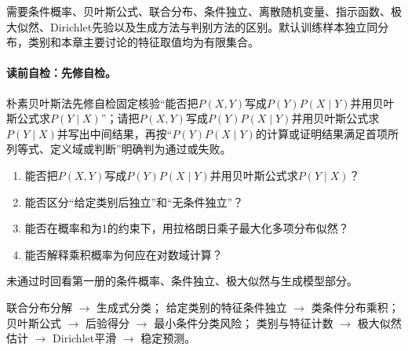 
\label{struct:V2-C03-CH02}
\begin{prerequisitebox}
需要条件概率、贝叶斯公式、联合分布、条件独立、离散随机变量、指示函数、极大似然、Dirichlet先验以及生成方法与判别方法的区别。默认训练样本独立同分布，类别和本章主要讨论的特征取值均为有限集合。
\end{prerequisitebox}

\label{struct:V2-C03-CH03}
\paragraph{读前自检：先修自检。}朴素贝叶斯法先修自检固定核验“能否把$P(X,Y)$写成$P(Y)P(X\mid Y)$并用贝叶斯公式求$P(Y\mid X)$”；请把$P(X,Y)$写成$P(Y)P(X\mid Y)$并用贝叶斯公式求$P(Y\mid X)$并写出中间结果，再按“$P(Y)P(X\mid Y)$的计算或证明结果满足首项所列等式、定义域或判断”明确判为通过或失败。\par

\begin{precheckbox}
\begin{enumerate}[leftmargin=2.2em]
  \item 能否把$P(X,Y)$写成$P(Y)P(X\mid Y)$并用贝叶斯公式求$P(Y\mid X)$？
  \item 能否区分“给定类别后独立”和“无条件独立”？
  \item 能否在概率和为1的约束下，用拉格朗日乘子最大化多项分布似然？
  \item 能否解释乘积概率为何应在对数域计算？
\end{enumerate}
未通过时回看第一册的条件概率、条件独立、极大似然与生成模型部分。
\end{precheckbox}

\label{struct:V2-C03-CH04}
\begin{dependencybox}
联合分布分解 $\to$ 生成式分类；
给定类别的特征条件独立 $\to$ 类条件分布乘积；
贝叶斯公式 $\to$ 后验得分 $\to$ 最小条件分类风险；
类别与特征计数 $\to$ 极大似然估计 $\to$ Dirichlet平滑 $\to$ 稳定预测。
\end{dependencybox}

